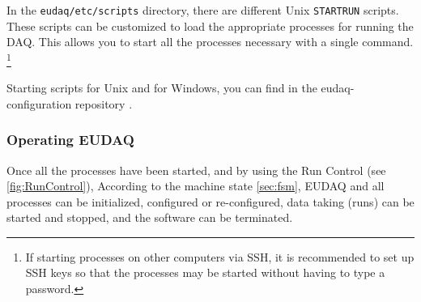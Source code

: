 In the \texttt{eudaq/etc/scripts} directory, there are different Unix \texttt{STARTRUN} scripts.
These scripts can be customized to load the appropriate processes for running the DAQ.
This allows you to start all the processes necessary with a single command.%
\footnote{If starting processes on other computers via SSH,
it is recommended to set up SSH keys so that the processes may be started without having to type a password.}

Starting scripts for Unix and for Windows, you can find in the eudaq-configuration repository \cite{githubEUDAQconfiguration}.

\subsubsection{Operating EUDAQ}
Once all the processes have been started, 
and by using the Run Control (see \autoref{fig:RunControl}),
According to the machine state \autoref{sec:fsm}, EUDAQ and all processes can be initialized, configured or re-configured, data taking (runs) can be started and stopped, and the software can be terminated.


